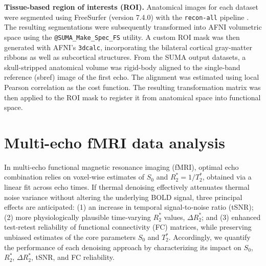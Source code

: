 \textbf{Tissue-based region of interests (ROI).} Anatomical images for each dataset were segmented using FreeSurfer (version 7.4.0) with the \texttt{recon-all} pipeline \citep{fischl2004automatically}. The resulting segmentations were subsequently transformed into AFNI volumetric space using the \texttt{@SUMA\_Make\_Spec\_FS} utility. A custom ROI mask was then generated with AFNI’s \texttt{3dcalc}, incorporating the bilateral cortical gray-matter ribbons as well as subcortical structures. From the SUMA output datasets, a skull-stripped anatomical volume was rigid-body aligned to the single-band reference (sbref) image of the first echo. The alignment was estimated using local Pearson correlation as the cost function. The resulting transformation matrix was then applied to the ROI mask to register it from anatomical space into functional space. 


\section{Multi-echo fMRI data analysis}

 In multi‑echo functional magnetic resonance imaging (fMRI), optimal echo combination relies on voxel‑wise estimates of \(S_0\) and \(R_2^* = 1/T_2^*\), obtained via a linear fit across echo times. If thermal denoising effectively attenuates thermal noise variance without altering the underlying BOLD signal, three principal effects are anticipated: (1) an increase in temporal signal‑to‑noise ratio (tSNR); (2) more physiologically plausible time‑varying \(R_2^*\) values, \(\Delta R_2^*\); and (3) enhanced test‑retest reliability of functional connectivity (FC) matrices, while preserving unbiased estimates of the core parameters \(S_0\) and \(T_2^*\). Accordingly, we quantify the performance of each denoising approach by characterizing its impact on \(S_0\), \(R_2^*\), \(\Delta R_2^*\), tSNR, and FC reliability.
 
